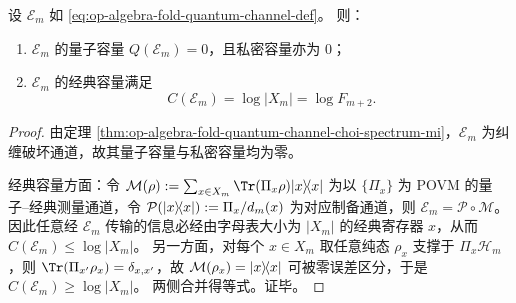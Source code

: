 \begin{theorem}\label{thm:op-algebra-fold-quantum-channel-capacity}
设 \(\mathcal{E}_m\) 如 \eqref{eq:op-algebra-fold-quantum-channel-def}。
则：
\begin{enumerate}
  \item \(\mathcal{E}_m\) 的量子容量 \(Q(\mathcal{E}_m)=0\)，且私密容量亦为 \(0\)；
  \item \(\mathcal{E}_m\) 的经典容量满足
  \[
  C(\mathcal{E}_m)=\log |X_m|=\log F_{m+2}.
  \]
\end{enumerate}
\end{theorem}
\begin{proof}
由定理 \ref{thm:op-algebra-fold-quantum-channel-choi-spectrum-mi}，\(\mathcal{E}_m\) 为纠缠破坏通道，故其量子容量与私密容量均为零。

经典容量方面：令 \(\mathcal{M}(\rho):=\sum_{x\in X_m}\Tr(\Pi_x\rho)\ket{x}\!\bra{x}\) 为以 \(\{\Pi_x\}\) 为 POVM 的量子--经典测量通道，令 \(\mathcal{P}(\lvert x\rangle\!\langle x\rvert):=\Pi_x/d_m(x)\) 为对应制备通道，则 \(\mathcal{E}_m=\mathcal{P}\circ\mathcal{M}\)。
因此任意经 \(\mathcal{E}_m\) 传输的信息必经由字母表大小为 \(|X_m|\) 的经典寄存器 \(x\)，从而 \(C(\mathcal{E}_m)\le \log|X_m|\)。
另一方面，对每个 \(x\in X_m\) 取任意纯态 \(\rho_x\) 支撑于 \(\Pi_x\mathcal{H}_m\)，则 \(\Tr(\Pi_{x'}\rho_x)=\delta_{x,x'}\)，故 \(\mathcal{M}(\rho_x)=\lvert x\rangle\!\langle x\rvert\) 可被零误差区分，于是 \(C(\mathcal{E}_m)\ge \log|X_m|\)。
两侧合并得等式。证毕。
\end{proof}

